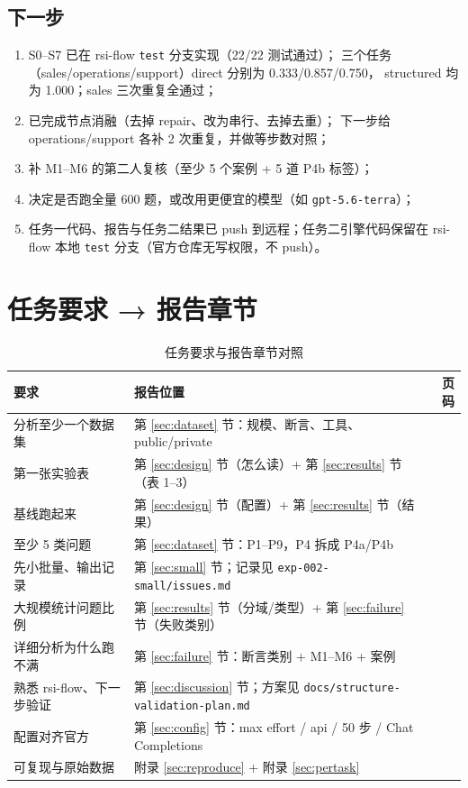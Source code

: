 \documentclass[UTF8,a4paper,11pt]{ctexart}
\begin{document}
\subsection{下一步}

\begin{enumerate}
  \item S0--S7 已在 rsi-flow \texttt{test} 分支实现（22/22 测试通过）；
  三个任务（sales/operations/support）direct 分别为 0.333/0.857/0.750，
  structured 均为 1.000；sales 三次重复全通过；
  \item 已完成节点消融（去掉 repair、改为串行、去掉去重）；
  下一步给 operations/support 各补 2 次重复，并做等步数对照；
  \item 补 M1--M6 的第二人复核（至少 5 个案例 + 5 道 P4b 标签）；
  \item 决定是否跑全量 600 题，或改用更便宜的模型（如 \texttt{gpt-5.6-terra}）；
  \item 任务一代码、报告与任务二结果已 push 到远程；任务二引擎代码保留在
  rsi-flow 本地 \texttt{test} 分支（官方仓库无写权限，不 push）。
\end{enumerate}

\appendix

\section{任务要求 → 报告章节}

\begin{table}[htbp]
\centering
\footnotesize
\caption{任务要求与报告章节对照}
\begin{tabularx}{\textwidth}{p{4.4cm}Xr}
\toprule
要求 & 报告位置 & 页码 \\
\midrule
分析至少一个数据集 & 第 \ref{sec:dataset} 节：规模、断言、工具、public/private & \pageref{sec:dataset} \\
第一张实验表 & 第 \ref{sec:design} 节（怎么读）+ 第 \ref{sec:results} 节（表 1--3） & \pageref{sec:results} \\
基线跑起来 & 第 \ref{sec:design} 节（配置）+ 第 \ref{sec:results} 节（结果） & \pageref{sec:results} \\
至少 5 类问题 & 第 \ref{sec:dataset} 节：P1--P9，P4 拆成 P4a/P4b & \pageref{sec:dataset} \\
先小批量、输出记录 & 第 \ref{sec:small} 节；记录见 \texttt{exp-002-small/issues.md} & \pageref{sec:small} \\
大规模统计问题比例 & 第 \ref{sec:results} 节（分域/类型）+ 第 \ref{sec:failure} 节（失败类别） & \pageref{sec:results} \\
详细分析为什么跑不满 & 第 \ref{sec:failure} 节：断言类别 + M1--M6 + 案例 & \pageref{sec:failure} \\
熟悉 rsi-flow、下一步验证 & 第 \ref{sec:discussion} 节；方案见 \texttt{docs/structure-validation-plan.md} & \pageref{sec:discussion} \\
配置对齐官方 & 第 \ref{sec:config} 节：max effort / api / 50 步 / Chat Completions & \pageref{sec:config} \\
可复现与原始数据 & 附录 \ref{sec:reproduce} + 附录 \ref{sec:pertask} & \pageref{sec:reproduce} \\
\bottomrule
\end{tabularx}
\end{table}
\end{document}
